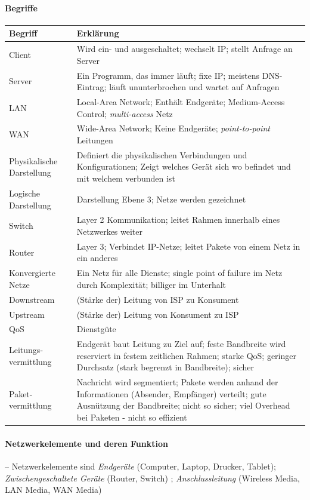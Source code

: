 \documentclass[a4paper,12pt]{article}
\begin{document}
\paragraph{Begriffe}
\begin{center}
\begin{tabular}{ | m{2.5cm} | m{9cm} | } 
Begriff & Erklärung\\ 
\hline
Client & Wird ein- und ausgeschaltet; wechselt IP; stellt Anfrage an Server\\
Server & Ein Programm, das immer läuft; fixe IP; meistens DNS- Eintrag; läuft ununterbrochen und wartet auf Anfragen\\
LAN & Local-Area Network; Enthält  Endgeräte; Medium-Access Control; \emph{multi-access} Netz \\
WAN &Wide-Area Network; Keine Endgeräte; \emph{point-to-point} Leitungen\\
Physikalische Darstellung & Definiert die physikalischen Verbindungen und Konfigurationen; Zeigt welches Gerät sich wo befindet und mit welchem verbunden ist\\
Logische Darstellung & Darstellung Ebene 3; Netze werden gezeichnet\\
Switch & Layer 2 Kommunikation; leitet Rahmen innerhalb eines Netzwerkes weiter\\
Router & Layer 3; Verbindet IP-Netze; leitet Pakete von einem Netz in ein anderes\\
Konvergierte Netze & Ein Netz für alle Dienste; single point of failure im Netz durch Komplexität; billiger im Unterhalt\\
Downstream & (Stärke der) Leitung von ISP zu Konsument\\
Upstream & (Stärke der) Leitung von Konsument zu ISP\\
QoS & Dienstgüte\\
Leitungs-vermittlung & Endgerät baut Leitung zu Ziel auf; feste Bandbreite wird reserviert in festem zeitlichen Rahmen; starke QoS; geringer Durchsatz (stark begrenzt in Bandbreite); sicher\\
Paket-vermittlung & Nachricht wird segmentiert; Pakete werden anhand der Informationen (Absender, Empfänger) verteilt; gute Ausnützung der Bandbreite; nicht so sicher; viel Overhead bei Paketen - nicht so effizient\\
\end{tabular}
\end{center}

\paragraph{Netzwerkelemente und deren Funktion} -- Netzwerkelemente sind \emph{Endgeräte} (Computer, Laptop, Drucker, Tablet); \emph{Zwischengeschaltete Geräte} (Router, Switch) ; \emph{Anschlussleitung} (Wireless Media, LAN Media, WAN Media)
\end{document}
